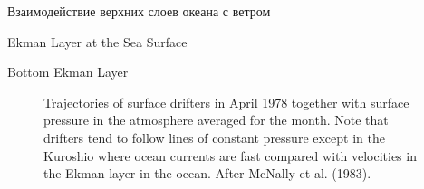\begin{chapter}{Взаимодействие верхних слоев океана с ветром}
\begin{section}{Ekman Layer at the Sea Surface}
\begin{paragraph}{Bottom Ekman Layer}
\begin{figure}[t!]
\caption{Trajectories of surface drifters
in April 1978 together with surface pressure in the atmosphere
averaged for the month. Note that drifters tend to follow lines of
constant pressure except in the Kuroshio where ocean currents are fast compared with velocities in
the Ekman layer in the ocean. After McNally et al. (1983).}
\label{drifterplot}
\end{figure}
%
\end{paragraph}


\end{section}
\end{chapter}
